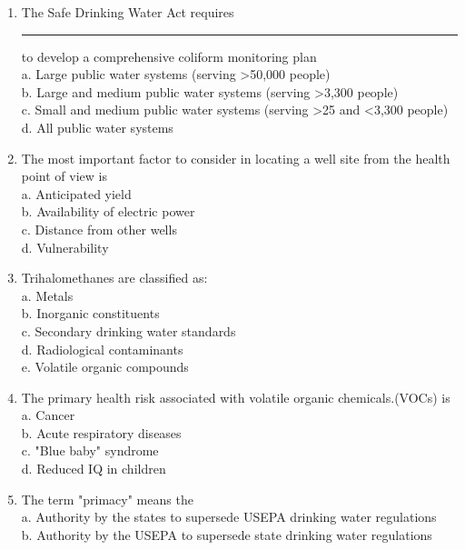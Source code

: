 \begin{enumerate}
\item The Safe Drinking Water Act requires \rule{1.5cm}{0.1mm} to develop a comprehensive coliform monitoring plan\\
a. Large public water systems (serving >50,000 people)\\
b. Large and medium public water systems (serving >3,300 people)\\
c. Small and medium public water systems (serving >25 and <3,300 people)\\
d. All public water systems\\

\item The most important factor to consider in locating a well site from the health point of view is\\
a. Anticipated yield\\
b. Availability of electric power\\
c. Distance from other wells\\
d. Vulnerability\\

\item Trihalomethanes are classified as:\\
a. Metals\\
b. Inorganic constituents\\
c. Secondary drinking water standards\\
d. Radiological contaminants\\
e. Volatile organic compounds\\


  \item The primary health risk associated with volatile organic chemicals.(VOCs) is\\

a. Cancer\\

b. Acute respiratory diseases\\

c. "Blue baby" syndrome\\

d. Reduced IQ in children\\

\item The term "primacy" means the\\

a. Authority by the states to supersede USEPA drinking water regulations\\

b. Authority by the USEPA to supersede state drinking water regulations\\


\end{enumerate}

